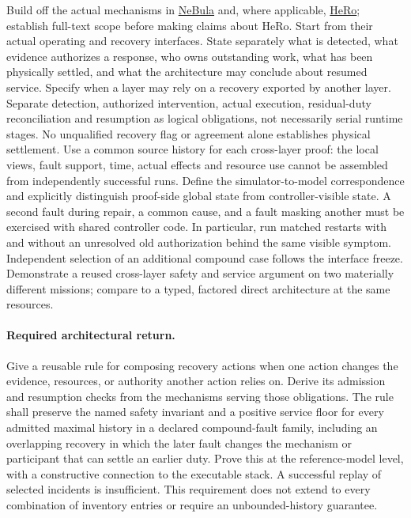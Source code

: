 \documentclass[11pt]{article}
\begin{document}
Build off the actual mechanisms in \href{https://arxiv.org/html/2103.11470}{NeBula} and, where applicable, \href{https://doi.org/10.1109/ICRA55743.2025.11128674}{HeRo}; establish full-text scope before making claims about HeRo. Start from their actual operating and recovery interfaces. State separately what is detected, what evidence authorizes a response, who owns outstanding work, what has been physically settled, and what the architecture may conclude about resumed service. Specify when a layer may rely on a recovery exported by another layer. Separate detection, authorized intervention, actual execution, residual-duty reconciliation and resumption as logical obligations, not necessarily serial runtime stages. No unqualified recovery flag or agreement alone establishes physical settlement. Use a common source history for each cross-layer proof: the local views, fault support, time, actual effects and resource use cannot be assembled from independently successful runs. Define the simulator-to-model correspondence and explicitly distinguish proof-side global state from controller-visible state. A second fault during repair, a common cause, and a fault masking another must be exercised with shared controller code. In particular, run matched restarts with and without an unresolved old authorization behind the same visible symptom. Independent selection of an additional compound case follows the interface freeze. Demonstrate a reused cross-layer safety and service argument on two materially different missions; compare to a typed, factored direct architecture at the same resources.

\paragraph{Required architectural return.} Give a reusable rule for composing recovery actions when one action changes the evidence, resources, or authority another action relies on. Derive its admission and resumption checks from the mechanisms serving those obligations. The rule shall preserve the named safety invariant and a positive service floor for every admitted maximal history in a declared compound-fault family, including an overlapping recovery in which the later fault changes the mechanism or participant that can settle an earlier duty. Prove this at the reference-model level, with a constructive connection to the executable stack. A successful replay of selected incidents is insufficient. This requirement does not extend to every combination of inventory entries or require an unbounded-history guarantee.
\end{document}
